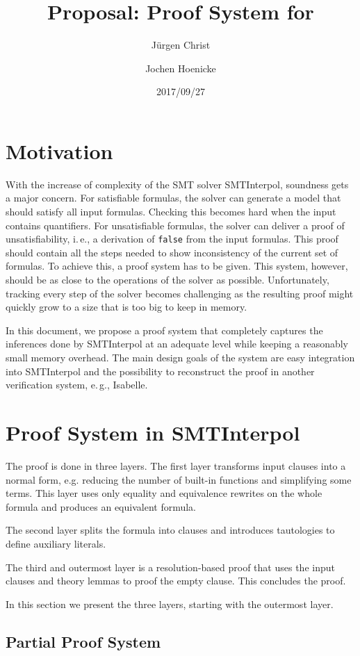 \documentclass[a4paper]{article}
\title{Proposal: Proof System for \siv}
\author{J{\"u}rgen Christ \and Jochen Hoenicke}
\date{2017/09/27}
\newcommand\si{SMTInterpol\xspace}
\begin{document}
\maketitle
\section{Motivation}
With the increase of complexity of the SMT solver \si, soundness gets a major
concern.  For satisfiable formulas, the solver can generate a model that
should satisfy all input formulas.  Checking this becomes hard when the input
contains quantifiers.  For unsatisfiable formulas, the solver can deliver a
proof of unsatisfiability, i.\,e., a derivation of \texttt{false} from the
input formulas.  This proof should contain all the steps needed to show
inconsistency of the current set of formulas.  To achieve this, a proof system
has to be given.  This system, however, should be as close to the operations
of the solver as possible.  Unfortunately, tracking every step of the solver
becomes challenging as the resulting proof might quickly grow to a size that is
too big to keep in memory.

In this document, we propose a proof system that completely captures
the inferences done by \si at an adequate level while keeping a
reasonably small memory overhead.  The main design goals of the system
are easy integration into \si and the possibility to reconstruct the
proof in another verification system, e.\,g., Isabelle.

\section{Proof System in \si}

The proof is done in three layers.  The first layer transforms input
clauses into a normal form, e.g. reducing the number of built-in
functions and simplifying some terms. This layer uses only equality
and equivalence rewrites on the whole formula and produces an
equivalent formula.

The second layer splits the formula into clauses and introduces
tautologies to define auxiliary literals.

The third and outermost layer is a resolution-based proof that uses
the input clauses and theory lemmas to proof the empty clause.
This concludes the proof.

In this section we present the three layers, starting with the
outermost layer.

\subsection{Partial Proof System}
\end{document}
